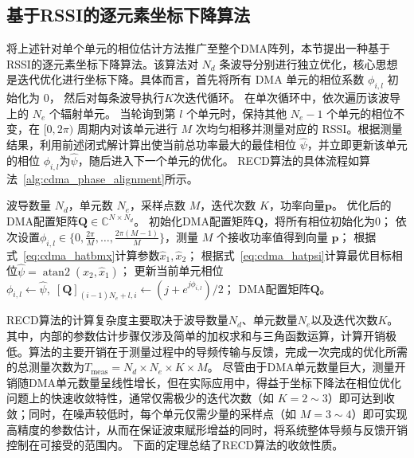 \subsection{基于RSSI的逐元素坐标下降算法}

将上述针对单个单元的相位估计方法推广至整个DMA阵列，本节提出一种基于RSSI的逐元素坐标下降算法。该算法对 $N_d$ 条波导分别进行独立优化，核心思想是迭代优化进行坐标下降。具体而言，首先将所有 DMA 单元的相位系数 $\phi_{i,l}$ 初始化为 $0$，
然后对每条波导执行$K$次迭代循环。
在单次循环中，依次遍历该波导上的 $N_e$ 个辐射单元。
当轮询到第 $l$ 个单元时，保持其他 $N_e-1$ 个单元的相位不变，在 $[0, 2\pi)$ 周期内对该单元进行 $M$ 次均匀相移并测量对应的 RSSI。根据测量结果，利用前述闭式解计算出使当前总功率最大的最佳相位 $\hat{\psi}$，并立即更新该单元的相位 $\phi_{i,l}$为$\hat{\psi}$，随后进入下一个单元的优化。
RECD算法的具体流程如算法~\ref{alg:cdma_phase_alignment}所示。

\begin{algorithm}[!t]
	\caption{基于RSSI的逐元素坐标下降算法（RECD）}
	\label{alg:cdma_phase_alignment}
	\begin{algorithmic}[1]
		\REQUIRE 波导数量 $N_d$，单元数 $N_e$，采样点数 $M$，迭代次数 $K$，功率向量$\bm p$。
		\ENSURE 优化后的DMA配置矩阵$\bm{Q} \in \mathbb{C}^{N \times N_d}$。
		\STATE 初始化DMA配置矩阵$\bm{Q}$，将所有相位初始化为0；
		\STATE 依次设置$\phi_{i,l} \in \{0, \frac{2\pi}{M}, \dots, \frac{2\pi(M-1)}{M}\}$，测量 $M$ 个接收功率值得到向量 $\bm p$；
		\STATE 根据式~\eqref{eq:cdma_hatbmx}计算参数$\hat{x}_1,\hat{x}_2$；
		\STATE 根据式~\eqref{eq:cdma_hatpsi}计算最优目标相位$\hat{\psi} = \operatorname{atan2}(\hat{x}_2, \hat{x}_1)$；
		\STATE 更新当前单元相位$\phi_{i,l} \leftarrow \hat{\psi},\;[\bm Q]_{(i-1)N_e+l,i}\leftarrow (j+e^{j\phi_{i,l}})/2$；
		\ENDFOR
		\ENDFOR
		\ENDFOR
		\RETURN DMA配置矩阵$\bm{Q}$。
	\end{algorithmic}
\end{algorithm}

RECD算法的计算复杂度主要取决于波导数量$N_d$、单元数量$N_e$以及迭代次数$K$。
其中，内部的参数估计步骤仅涉及简单的加权求和与三角函数运算，计算开销极低。算法的主要开销在于测量过程中的导频传输与反馈，完成一次完成的优化所需的总测量次数为$T_{\text{meas}} = N_d \times N_e \times K \times M$。
尽管由于DMA单元数量巨大，测量开销随DMA单元数量呈线性增长，但在实际应用中，得益于坐标下降法在相位优化问题上的快速收敛特性，通常仅需极少的迭代次数（如 $K=2 \sim 3$）即可达到收敛；同时，在噪声较低时，每个单元仅需少量的采样点（如 $M=3 \sim 4$）即可实现高精度的参数估计，从而在保证波束赋形增益的同时，将系统整体导频与反馈开销控制在可接受的范围内。
下面的定理总结了RECD算法的收敛性质。


